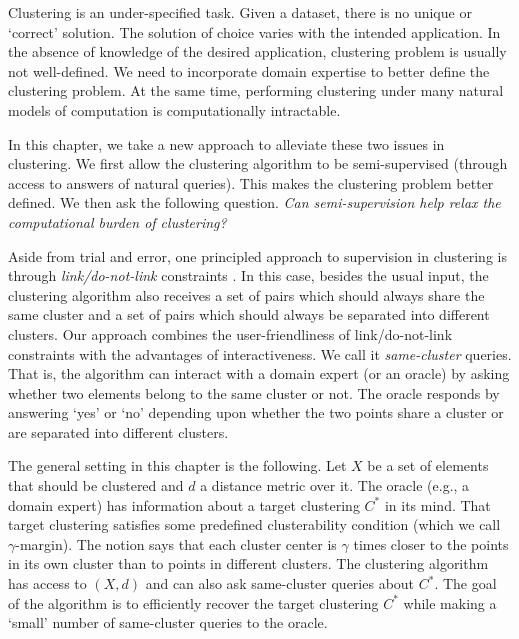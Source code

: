 \documentclass[12pt]{article}
\begin{document}
\fi

Clustering is an under-specified task. Given a dataset, there is no unique or `correct' solution. The solution of choice varies with the intended application. In the absence of knowledge of the desired application, clustering problem is usually not well-defined. We need to incorporate domain expertise to better define the clustering problem. At the same time, performing clustering under many natural models of computation is computationally intractable. 

In this chapter, we take a new approach to alleviate these two issues in clustering. We first allow the clustering algorithm to be semi-supervised (through access to answers of natural queries). This makes the clustering problem better defined. We then ask the following question. \textit{Can semi-supervision help relax the computational burden of clustering?}

Aside from trial and error, one principled approach to supervision in clustering is through \textit{link/do-not-link} constraints \cite{basu2002semi,basu2004probabilistic, kulis2009semi}. In this case, besides the usual input, the clustering algorithm also receives a set of pairs which should always share the same cluster and a set of pairs which should always be separated into different clusters. Our approach combines the user-friendliness of link/do-not-link constraints with the advantages of interactiveness. We call it \textit{same-cluster} queries.  That is, the algorithm can interact with a domain expert (or an oracle) by asking whether two elements belong to the same cluster or not. The oracle responds by answering `yes' or `no' depending upon whether the two points share a cluster or are separated into different clusters. 

The general setting in this chapter is the following. Let $X$ be a set of elements that should be clustered and $d$ a distance metric over it. The oracle (e.g., a domain expert) has information about a target clustering $C^*$ in its mind. That target clustering satisfies some predefined clusterability condition (which we call $\gamma$-margin). The notion says that each cluster center is $\gamma$ times closer to the points in its own cluster than to points in different clusters. The clustering algorithm has access to $(X, d)$ and can also ask same-cluster queries about $C^*$. The goal of the algorithm is to efficiently recover the target clustering $C^*$ while making a `small' number of same-cluster queries to the oracle. 
\end{document}
